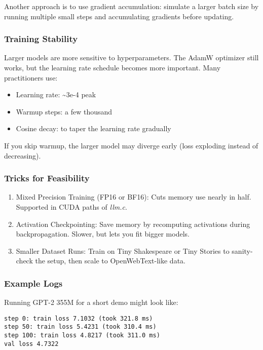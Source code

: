 \documentclass[
  letterpaper,
  DIV=11,
  numbers=noendperiod]{scrreprt}
\providecommand{\tightlist}{%
  \setlength{\itemsep}{0pt}\setlength{\parskip}{0pt}}
\begin{document}
Another approach is to use gradient accumulation: simulate a larger
batch size by running multiple small steps and accumulating gradients
before updating.

\subsubsection{Training Stability}\label{training-stability}

Larger models are more sensitive to hyperparameters. The AdamW optimizer
still works, but the learning rate schedule becomes more important. Many
practitioners use:

\begin{itemize}
\tightlist
\item
  Learning rate: \textasciitilde3e-4 peak
\item
  Warmup steps: a few thousand
\item
  Cosine decay: to taper the learning rate gradually
\end{itemize}

If you skip warmup, the larger model may diverge early (loss exploding
instead of decreasing).

\subsubsection{Tricks for Feasibility}\label{tricks-for-feasibility}

\begin{enumerate}
\def\labelenumi{\arabic{enumi}.}
\tightlist
\item
  Mixed Precision Training (FP16 or BF16): Cuts memory use nearly in
  half. Supported in CUDA paths of \emph{llm.c}.
\item
  Activation Checkpointing: Save memory by recomputing activations
  during backpropagation. Slower, but lets you fit bigger models.
\item
  Smaller Dataset Runs: Train on Tiny Shakespeare or Tiny Stories to
  sanity-check the setup, then scale to OpenWebText-like data.
\end{enumerate}

\subsubsection{Example Logs}\label{example-logs}

Running GPT-2 355M for a short demo might look like:

\begin{verbatim}
step 0: train loss 7.1032 (took 321.8 ms)
step 50: train loss 5.4231 (took 310.4 ms)
step 100: train loss 4.8217 (took 311.0 ms)
val loss 4.7322
\end{verbatim}
\end{document}
